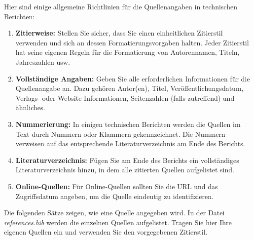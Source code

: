 \documentclass[praktikum,german]{hgbthesis}
\begin{document}
\noindent Hier sind einige allgemeine Richtlinien für die Quellenangaben in technischen Berichten:\\

\begin{enumerate}
	\item \textbf{Zitierweise:} Stellen Sie sicher, dass Sie einen einheitlichen Zitierstil verwenden und sich an dessen Formatierungsvorgaben halten. Jeder Zitierstil hat seine eigenen
				Regeln für die Formatierung von Autorennamen, Titeln, Jahreszahlen usw.
	\item \textbf{Vollständige Angaben:} Geben Sie alle erforderlichen Informationen für die Quellenangabe an. Dazu gehören Autor(en), Titel, Veröffentlichungsdatum, Verlags- oder Website
				Informationen, Seitenzahlen (falls zutreffend) und ähnliches.
	\item \textbf{Nummerierung:} In einigen technischen Berichten werden die Quellen im Text durch Nummern oder Klammern gekennzeichnet. Die Nummern verweisen auf das entsprechende
				Literaturverzeichnis am Ende des Berichts.
	\item \textbf{Literaturverzeichnis:} Fügen Sie am Ende des Berichts ein vollständiges Literaturverzeichnis hinzu, in dem alle zitierten Quellen aufgelistet sind.
	\item \textbf{Online-Quellen:} Für Online-Quellen sollten Sie die URL und das Zugriffsdatum angeben, um die Quelle eindeutig zu identifizieren.
\end{enumerate}

\vspace{1cm}
\noindent Die folgenden Sätze zeigen, wie eine Quelle angegeben wird. In der Datei \textit{references.bib} werden die einzelnen Quellen
aufgelistet. Tragen Sie hier Ihre eigenen Quellen ein und verwenden Sie den vorgegebenen Zitierstil.\\





\printbibliography[heading=bibintoc]
\end{document}

